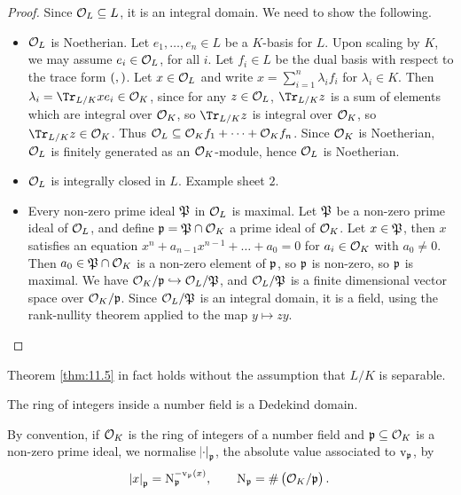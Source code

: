 \begin{proof}
Since $ \mathcal{O}_L \subseteq L $, it is an integral domain. We need to show the following.
\begin{itemize}
\item $ \mathcal{O}_L $ is Noetherian. Let $ e_1, \dots, e_n \in L $ be a $ K $-basis for $ L $. Upon scaling by $ K $, we may assume $ e_i \in \mathcal{O}_L $, for all $ i $. Let $ f_i \in L $ be the dual basis with respect to the trace form $ \br{,} $. Let $ x \in \mathcal{O}_L $ and write $ x = \sum_{i = 1}^n \lambda_if_i $ for $ \lambda_i \in K $. Then $ \lambda_i = \Tr_{L / K} xe_i \in \OOO_K $, since for any $ z \in \mathcal{O}_L $, $ \Tr_{L / K} z $ is a sum of elements which are integral over $ \mathcal{O}_K $, so $ \Tr_{L / K} z $ is integral over $ \mathcal{O}_K $, so $ \Tr_{L / K} z \in \OOO_K $. Thus $ \mathcal{O}_L \subseteq \mathcal{O}_Kf_1 + \dots + \mathcal{O}_Kf_n $. Since $ \mathcal{O}_K $ is Noetherian, $ \mathcal{O}_L $ is finitely generated as an $ \mathcal{O}_K $-module, hence $ \mathcal{O}_L $ is Noetherian.
\item $ \mathcal{O}_L $ is integrally closed in $ L $. Example sheet $ 2 $.
\item Every non-zero prime ideal $ \mathfrak{P} $ in $ \mathcal{O}_L $ is maximal. Let $ \mathfrak{P} $ be a non-zero prime ideal of $ \mathcal{O}_L $, and define $ \mathfrak{p} = \mathfrak{P} \cap \mathcal{O}_K $ a prime ideal of $ \mathcal{O}_K $. Let $ x \in \mathfrak{P} $, then $ x $ satisfies an equation $ x^n + a_{n - 1}x^{n - 1} + \dots + a_0 = 0 $ for $ a_i \in \mathcal{O}_K $ with $ a_0 \ne 0 $. Then $ a_0 \in \mathfrak{P} \cap \mathcal{O}_K $ is a non-zero element of $ \mathfrak{p} $, so $ \mathfrak{p} $ is non-zero, so $ \mathfrak{p} $ is maximal. We have $ \mathcal{O}_K / \mathfrak{p} \hookrightarrow \mathcal{O}_L / \mathfrak{P} $, and $ \mathcal{O}_L / \mathfrak{P} $ is a finite dimensional vector space over $ \mathcal{O}_K / \mathfrak{p} $. Since $ \mathcal{O}_L / \mathfrak{P} $ is an integral domain, it is a field, using the rank-nullity theorem applied to the map $ y \mapsto zy $.
\end{itemize}
\end{proof}

\begin{remark*}
Theorem \ref{thm:11.5} in fact holds without the assumption that $ L / K $ is separable.
\end{remark*}

\begin{corollary}
The ring of integers inside a number field is a Dedekind domain.
\end{corollary}

By convention, if $ \mathcal{O}_K $ is the ring of integers of a number field and $ \mathfrak{p} \subseteq \mathcal{O}_K $ is a non-zero prime ideal, we normalise $ \abs{\cdot}_{\mathfrak{p}} $, the absolute value associated to $ \mathrm{v}_{\mathfrak{p}} $, by
$$ \abs{x}_\ppp = \N_\ppp^{-\v_\ppp\br{x}}, \qquad \N_\ppp = \#\br{\OOO_K / \ppp}. $$

